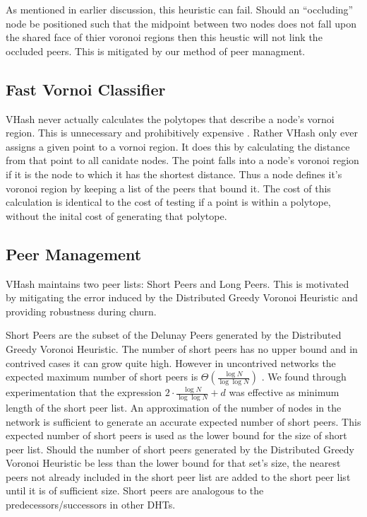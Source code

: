 \documentclass{IEEEtran}
\begin{document}
As mentioned in earlier discussion, this heuristic can fail. Should an ``occluding'' node be positioned such that the midpoint between two nodes does not fall upon the shared face of thier voronoi regions then this heustic will not link the occluded peers. %
This is mitigated by our method of peer managment.


\subsection{Fast Vornoi Classifier}
VHash never actually calculates the polytopes that describe a node's vornoi region.
This is unnecessary and prohibitively expensive \cite{raynet}.
Rather VHash only ever assigns a given point to a vornoi region.
It does this by calculating the distance from that point to all canidate nodes.
The point falls into a node's voronoi region if it is the node to which it has the shortest distance.
Thus a node defines it's voronoi region by keeping a list of the peers that bound it.
The cost of this calculation is identical to the cost of testing if a point is within a polytope, without the inital cost of generating that polytope.

\subsection{Peer Management}
VHash maintains two peer lists: Short Peers and Long Peers.
This is motivated by mitigating the error induced by the Distributed Greedy Voronoi Heuristic and providing robustness during churn.

Short Peers are the subset of the Delunay Peers generated by the Distributed Greedy Voronoi Heuristic. 
The number of short peers has no upper bound and in contrived cases it can grow quite high. However in uncontrived networks the expected maximum number of short peers is $\Theta(\frac{\log N}{\log \log N} )$ \cite{bern1991expected}.
We found through experimentation that the expression $2 \cdot \frac{\log N}{\log \log N} + d$ was effective as  minimum length of the short peer list.
An approximation of the number of nodes in the network is sufficient to generate an accurate expected number of short peers.  
This expected number of short peers is used as the lower bound for the size of short peer list.
Should the number of short peers generated by the Distributed Greedy Voronoi Heuristic be less than the lower bound for that set's size, the nearest peers not already included in the short peer list are added to the short peer list until it is of sufficient size.
Short peers are analogous to the predecessors/successors in other DHTs.
\end{document}
